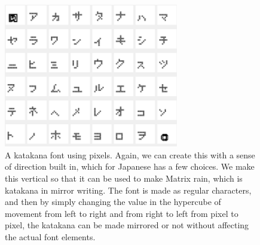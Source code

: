 \begin{figure}
	\centering
	\includegraphics[width=3in]{figures/shapes/katakana.png}
	\caption[katakana]
	{A katakana font using pixels.  Again, we can create this with a sense of direction built in, which for Japanese has a few choices. We make this vertical so that it can be used to make Matrix rain, which is katakana in mirror writing. The font is made as regular characters, and then by simply changing the value in the hypercube of movement from left to right and from right to left from pixel to pixel, the katakana can be made mirrored or not without affecting the actual font elements.}
\end{figure}

